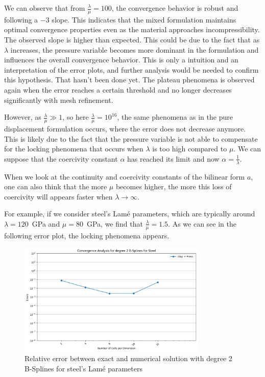 \documentclass[a4paper,12pt,twoside]{report}
\begin{document}
We can observe that from $\frac{\lambda}{\mu} = 100$, the convergence behavior is robust and following a $-3$ slope. This indicates that the mixed formulation maintains optimal convergence properties even as the material approaches incompressibility. The observed slope is higher than expected. This could be due to the fact that as $\lambda$ increases, the pressure variable becomes more dominant in the formulation and influences the overall convergence behavior. This is only a intuition and an interpretation of the error plots, and further analysis would be needed to confirm this hypothesis. That hasn't been done yet.
The plateau phenomena is observed again when the error reaches a certain threshold and no longer decreases significantly with mesh refinement.

However, as $\frac{\lambda}{\mu} \gg 1$, so here $\frac{\lambda}{\mu} = 10^{16}$, the same phenomena as in the pure displacement formulation occurs, where the error does not decrease anymore. This is likely due to the fact that the pressure variable is not able to compensate for the locking phenomena that occurs when $\lambda$ is too high compared to $\mu$. We can suppose that the coercivity constant $\alpha$ has reached its limit and now $\alpha = \frac{1}{\lambda}$.

When we look at the continuity and coercivity constants of the bilinear form $a$, one can also think that the more $\mu$ becomes higher, the more this loss of coercivity will appears faster when $\lambda \rightarrow \infty$.

For example, if we consider steel's Lamé parameters, which are typically around $\lambda = 120$~GPa and $\mu = 80$~GPa, we find that $\frac{\lambda}{\mu} = 1.5$. As we can see in the following error plot, the locking phenomena appears.

\begin{figure}[!h]
	\centering
	\includegraphics[width=0.8\textwidth]{figures/figures_mixed_DH/sum_convergence_plot_degree_2_lambda=120000000000.0.png}
	\caption{Relative error between exact and numerical solution with degree 2 B-Splines for steel's Lamé parameters}
	\label{fig:convergencedegree2mixeddirichlethomogeneoussteel}
\end{figure}
\end{document}
